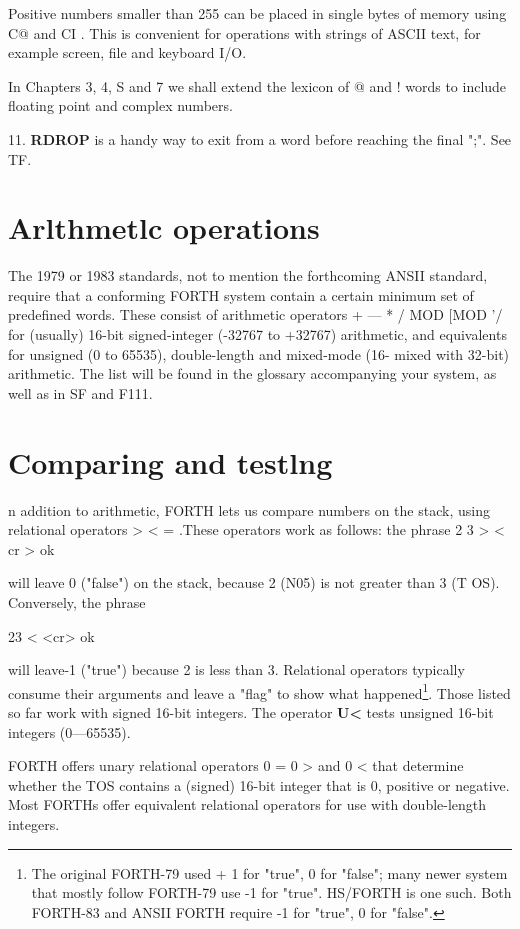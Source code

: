 Positive numbers smaller than 255 can be placed in single bytes of memory using C@ and CI . This is convenient for operations with strings of ASCII text, for example screen, file and keyboard I/O.

In Chapters 3, 4, S and 7 we shall extend the lexicon of @ and ! words to include floating point and complex numbers.

11. \textbf{RDROP} is a handy way to exit from a word before reaching the final ";". See TF.

\section{Arlthmetlc operations}

The 1979 or 1983 standards, not to mention the forthcoming ANSII standard, require that a conforming FORTH system contain a certain minimum set of predefined words. These consist of arithmetic operators + — * / MOD [MOD '/ for (usually) 16-bit signed-integer (-32767 to +32767) arithmetic, and equivalents for unsigned (0 to 65535), double-length and mixed-mode (16- mixed with 32-bit) arithmetic. The list will be found in the glossary accompanying your system, as well as in SF and F111.

\section{Comparing and testlng}

n addition to arithmetic, FORTH lets us compare numbers on the stack, using relational operators > < = .These operators work as follows: the phrase
2 3 > < cr > ok

will leave 0 ("false") on the stack, because 2 (N05) is not greater
than 3 (T OS). Conversely, the phrase

23 < <cr> ok

will leave-1 ("true") because 2 is less than 3. Relational operators typically consume their arguments and leave a "ﬂag" to show what happened\footnote{ The original FORTH-79 used + 1 for "true", 0 for "false"; many newer system that mostly follow FORTH-79 use -1 for "true". HS/FORTH is one such. Both FORTH-83 and ANSII FORTH require -1 for "true", 0 for "false".}. Those listed so far work with signed 16-bit integers. The operator \textbf{U<} tests unsigned 16-bit integers (0—65535).

FORTH offers unary relational operators 0 = 0 > and 0 < that determine whether the TOS contains a (signed) 16-bit integer that is 0, positive or negative. Most FORTHs offer equivalent relational operators for use with double-length integers.

